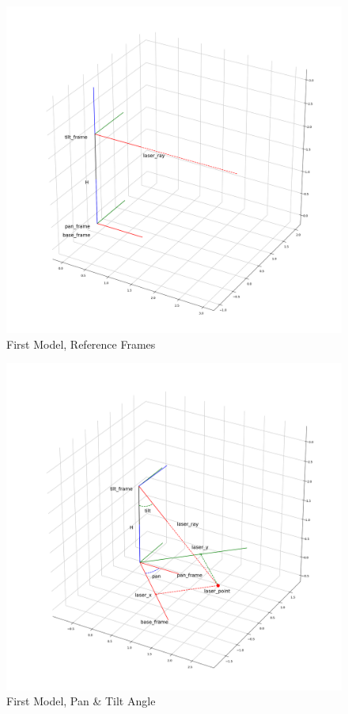 \begin{figure}
	\centering
	\includegraphics[width=\textwidth]{img/firstModel.png}%
	\caption{First Model, Reference Frames}
	\label{fig:firstModelRefFrame}
\end{figure}
\begin{figure}
	\centering
	\includegraphics[width=\textwidth]{img/model1XY.png}%
	\caption{First Model, Pan \& Tilt Angle}
	\label{fig:firstModelPanTilt}
\end{figure}
